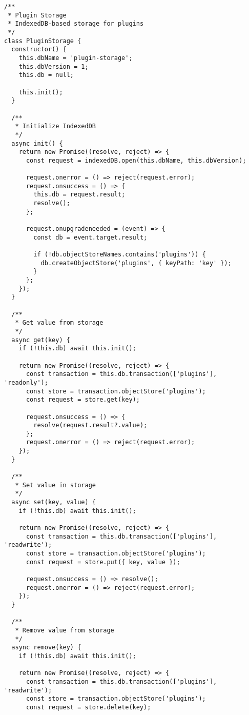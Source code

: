 \documentclass[11pt]{article}
\begin{document}
\begin{verbatim}
/**
 * Plugin Storage
 * IndexedDB-based storage for plugins
 */
class PluginStorage {
  constructor() {
    this.dbName = 'plugin-storage';
    this.dbVersion = 1;
    this.db = null;
    
    this.init();
  }
  
  /**
   * Initialize IndexedDB
   */
  async init() {
    return new Promise((resolve, reject) => {
      const request = indexedDB.open(this.dbName, this.dbVersion);
      
      request.onerror = () => reject(request.error);
      request.onsuccess = () => {
        this.db = request.result;
        resolve();
      };
      
      request.onupgradeneeded = (event) => {
        const db = event.target.result;
        
        if (!db.objectStoreNames.contains('plugins')) {
          db.createObjectStore('plugins', { keyPath: 'key' });
        }
      };
    });
  }
  
  /**
   * Get value from storage
   */
  async get(key) {
    if (!this.db) await this.init();
    
    return new Promise((resolve, reject) => {
      const transaction = this.db.transaction(['plugins'], 'readonly');
      const store = transaction.objectStore('plugins');
      const request = store.get(key);
      
      request.onsuccess = () => {
        resolve(request.result?.value);
      };
      request.onerror = () => reject(request.error);
    });
  }
  
  /**
   * Set value in storage
   */
  async set(key, value) {
    if (!this.db) await this.init();
    
    return new Promise((resolve, reject) => {
      const transaction = this.db.transaction(['plugins'], 'readwrite');
      const store = transaction.objectStore('plugins');
      const request = store.put({ key, value });
      
      request.onsuccess = () => resolve();
      request.onerror = () => reject(request.error);
    });
  }
  
  /**
   * Remove value from storage
   */
  async remove(key) {
    if (!this.db) await this.init();
    
    return new Promise((resolve, reject) => {
      const transaction = this.db.transaction(['plugins'], 'readwrite');
      const store = transaction.objectStore('plugins');
      const request = store.delete(key);
      

\end{verbatim}
\end{document}
